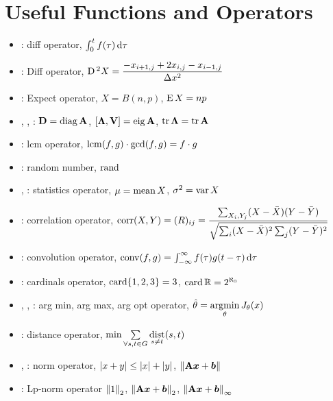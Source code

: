 \documentclass{article}
\begin{document}
\section{Useful Functions and Operators}
\begin{itemize}
\item {}: diff operator, $\int_0^t f(\tau) \operatorname{d\!} \tau$
\item {}: Diff operator, $\operatorname{D}{}^2 X = \dfrac{-x_{i + 1, j} + 2x_{i, j} - x_{i - 1, j}}{\Delta x^2}$
\item {}: Expect operator, $X = B(n, p)$, $\operatorname{E} X = np$
\item {}, , : ${\mathbf D} = \operatorname{diag} {\mathbf A}$, $[{\bm \Lambda}, {\mathbf V}] = \operatorname{eig} {\mathbf A}$, $\operatorname{tr} {\bm \Lambda} = \operatorname{tr} {\mathbf A}$
\item {}: lcm operator, $\operatorname{lcm}(f, g) \cdot \gcd(f, g) = f \cdot g$
\item {}: random number, $\operatorname{rand}$
\item {}, : statistics operator, $\mu = \operatorname{mean} X$, $\sigma^2 = \operatorname{var} X$
\item {}: correlation operator, $\operatorname{corr}(X, Y) = (R)_{ij} = \dfrac{\sum_{X_i, Y_j}(X - \bar X)(Y - \bar Y)}{\sqrt{\sum_i(X - \bar X)^2\sum_j(Y - \bar Y)^2}}$
\item {}: convolution operator, $\operatorname{conv}(f, g) = \int_{-\infty}^\infty f(\tau)g(t - \tau) \operatorname{d\!} \tau$
\item {}: cardinals operator, $\operatorname{card} \{1, 2, 3\} = 3$, $\operatorname{card} {\mathbb R} = 2^{\aleph_0}$
\item {}, , : arg min, arg max, arg opt operator, $\hat \theta = \operatorname*{argmin}\limits_\theta J_\theta(x)$
\item {}: distance operator, $\min \sum\limits_{\forall s, t \in G} \operatorname*{dist}\limits_{s \ne t} (s, t)$
\item {}, : norm operator, ${\lvert {x+y} \rvert} \leq {\lvert {x} \rvert} + {\lvert {y} \rvert}$, ${\| {{\mathbf A} {\bm x} + {\bm b}} \|}$
\item {}: Lp-norm operator ${{\| {1} \|}}_{2}$, ${{\| {{\mathbf A} {\bm x} + {\bm b}} \|}}_{2}$, ${{\| {{\mathbf A} {\bm x} + {\bm b}} \|}}_{\infty}$
\end{itemize}
\end{document}
